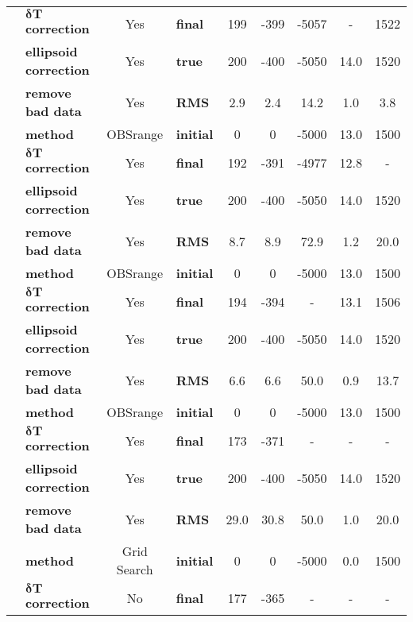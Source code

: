 \begin{table}
{\begin{tabular}{c || l c | l c c c c c}
\multirow{4}{*}{} & $\mathbf{\delta T}$ \textbf{correction} & Yes & \textbf{final}& 199 & -399 & -5057 & - & 1522 \\ 
\multirow{4}{*}{} & \textbf{ellipsoid correction} & Yes & \textbf{true}& 200 & -400 & -5050 & 14.0 & 1520 \\ 
\multirow{4}{*}{} & \textbf{remove bad data} & Yes & \textbf{RMS} & 2.9 & 2.4 & 14.2 & 1.0 & 3.8 \\ 
\hline
\multirow{4}{*}{\textbf{XYZ$\mathbf{\tau}$}} & \textbf{method} & OBSrange & \textbf{initial} & 0 & 0 & -5000 & 13.0 & 1500 \\ 
\multirow{4}{*}{} & $\mathbf{\delta T}$ \textbf{correction} & Yes & \textbf{final}& 192 & -391 & -4977 & 12.8 & - \\ 
\multirow{4}{*}{} & \textbf{ellipsoid correction} & Yes & \textbf{true}& 200 & -400 & -5050 & 14.0 & 1520 \\ 
\multirow{4}{*}{} & \textbf{remove bad data} & Yes & \textbf{RMS} & 8.7 & 8.9 & 72.9 & 1.2 & 20.0 \\ 
\hline
\multirow{4}{*}{\textbf{XY$\mathbf{\tau V_p}$}} & \textbf{method} & OBSrange & \textbf{initial} & 0 & 0 & -5000 & 13.0 & 1500 \\ 
\multirow{4}{*}{} & $\mathbf{\delta T}$ \textbf{correction} & Yes & \textbf{final}& 194 & -394 & - & 13.1 & 1506 \\ 
\multirow{4}{*}{} & \textbf{ellipsoid correction} & Yes & \textbf{true}& 200 & -400 & -5050 & 14.0 & 1520 \\ 
\multirow{4}{*}{} & \textbf{remove bad data} & Yes & \textbf{RMS} & 6.6 & 6.6 & 50.0 & 0.9 & 13.7 \\ 
\hline
\multirow{4}{*}{\textbf{XY}} & \textbf{method} & OBSrange & \textbf{initial} & 0 & 0 & -5000 & 13.0 & 1500 \\ 
\multirow{4}{*}{} & $\mathbf{\delta T}$ \textbf{correction} & Yes & \textbf{final}& 173 & -371 & - & - & - \\ 
\multirow{4}{*}{} & \textbf{ellipsoid correction} & Yes & \textbf{true}& 200 & -400 & -5050 & 14.0 & 1520 \\ 
\multirow{4}{*}{} & \textbf{remove bad data} & Yes & \textbf{RMS} & 29.0 & 30.8 & 50.0 & 1.0 & 20.0 \\ 
\hline
\multirow{4}{*}{\textbf{SIOgs}} & \textbf{method} & Grid Search & \textbf{initial} & 0 & 0 & -5000 & 0.0 & 1500 \\ 
\multirow{4}{*}{} & $\mathbf{\delta T}$ \textbf{correction} & No & \textbf{final}& 177 & -365 & - & - & - \\ 

\end{tabular}}
\end{table}
